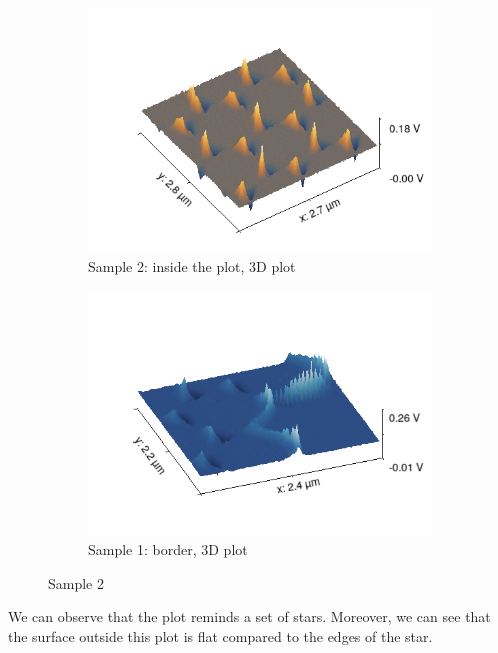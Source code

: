 \documentclass[11pt,a4paper]{article}
\begin{document}
\begin{figure}[H]
\begin{subfigure}[b]{0.45\textwidth}
\includegraphics[width=\textwidth]{sm_sample2_3D}
\caption{Sample 2: inside the plot, 3D plot}
\label{fig:}
\end{subfigure}
\begin{subfigure}[b]{0.45\textwidth}
\includegraphics[width=\textwidth]{sm_sample2_border_3D}
\caption{Sample 1: border, 3D plot}
\label{fig:}
\end{subfigure}
\caption{Sample 2}
\end{figure}

We can observe that the plot reminds a set of stars. Moreover, we can see that the surface outside this plot is flat compared to the edges of the star.
\end{document}
